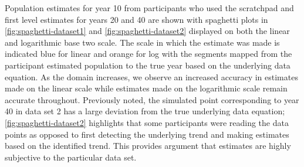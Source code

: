 \documentclass[print]{nuthesis}
\begin{document}
Population estimates for year 10 from participants who used the scratchpad and first level estimates for years 20 and 40 are shown with spaghetti plots in \cref{fig:spaghetti-dataset1} and \cref{fig:spaghetti-dataset2} displayed on both the linear and logarithmic base two scale.
The scale in which the estimate was made is indicated blue for linear and orange for log with the segments mapped from the participant estimated population to the true year based on the underlying data equation.
As the domain increases, we observe an increased accuracy in estimates made on the linear scale while estimates made on the logarithmic scale remain accurate throughout.
Previously noted, the simulated point corresponding to year 40 in data set 2 has a large deviation from the true underlying data equation; \cref{fig:spaghetti-dataset2} highlights that some participants were reading the data points as opposed to first detecting the underlying trend and making estimates based on the identified trend.
This provides argument that estimates are highly subjective to the particular data set.
\end{document}
